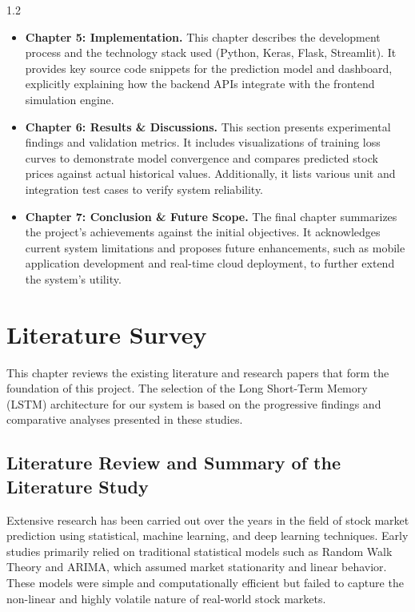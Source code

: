 \documentclass[12pt, a4paper]{report}
\begin{document}
\begin{spacing}{1.2}
\begin{itemize}
\item \textbf{Chapter 5: Implementation.} This chapter describes the development process and the technology stack used (Python, Keras, Flask, Streamlit). It provides key source code snippets for the prediction model and dashboard, explicitly explaining how the backend APIs integrate with the frontend simulation engine.

\item \textbf{Chapter 6: Results \& Discussions.} This section presents experimental findings and validation metrics. It includes visualizations of training loss curves to demonstrate model convergence and compares predicted stock prices against actual historical values. Additionally, it lists various unit and integration test cases to verify system reliability.

\item \textbf{Chapter 7: Conclusion \& Future Scope.} The final chapter summarizes the project's achievements against the initial objectives. It acknowledges current system limitations and proposes future enhancements, such as mobile application development and real-time cloud deployment, to further extend the system's utility.
\end{itemize}

\chapter{Literature Survey}

This chapter reviews the existing literature and research papers that form the foundation of this project. The selection of the Long Short-Term Memory (LSTM) architecture for our system is based on the progressive findings and comparative analyses presented in these studies.

\section{Literature Review and Summary of the Literature Study}

Extensive research has been carried out over the years in the field of stock market prediction using statistical, machine learning, and deep learning techniques. Early studies primarily relied on traditional statistical models such as Random Walk Theory and ARIMA, which assumed market stationarity and linear behavior. These models were simple and computationally efficient but failed to capture the non-linear and highly volatile nature of real-world stock markets.


\end{spacing}
\end{document}
